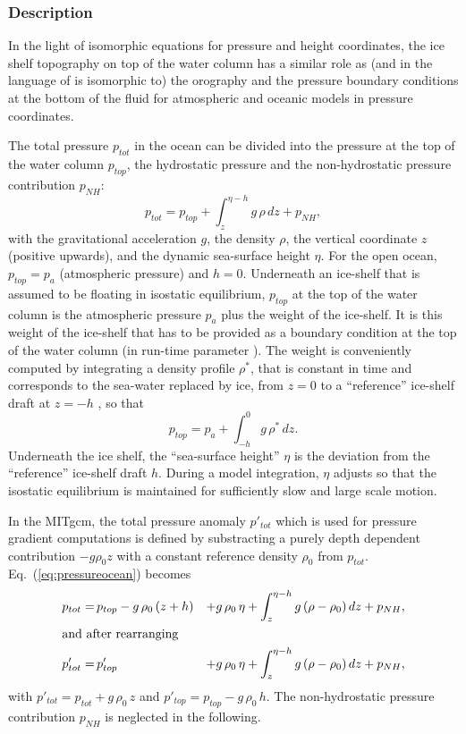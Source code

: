 \subsubsection{Description
\label{sec:pkg:shelfice:descr}}

In the light of isomorphic equations for pressure and height
coordinates, the ice shelf topography on top of the water column has a
similar role as (and in the language of \citet{marshall:04} is
isomorphic to) the orography and the pressure boundary conditions at
the bottom of the fluid for atmospheric and oceanic models in pressure
coordinates.
%

The total pressure $p_{tot}$ in the ocean can be divided into the
pressure at the top of the water column $p_{top}$, the hydrostatic
pressure and the non-hydrostatic pressure contribution $p_{NH}$:
\begin{equation}
  \label{eq:pressureocean}
  p_{tot} = p_{top} + \int_z^{\eta-h} g\,\rho\,dz + p_{NH}, 
\end{equation}
with the gravitational acceleration $g$, the density $\rho$, the
vertical coordinate $z$ (positive upwards), and the dynamic
sea-surface height $\eta$. For the open ocean, $p_{top}=p_{a}$
(atmospheric pressure) and $h=0$. Underneath an ice-shelf that is
assumed to be floating in isostatic equilibrium, $p_{top}$ at the top
of the water column is the atmospheric pressure $p_{a}$ plus the
weight of the ice-shelf. It is this weight of the ice-shelf that has
to be provided as a boundary condition at the top of the water column
(in run-time parameter ).
The weight is conveniently computed by integrating a density profile
$\rho^*$, that is constant in time and corresponds to the sea-water
replaced by ice, from $z=0$ to a ``reference'' ice-shelf draft at
$z=-h$ \citep{beckmann99}, so that
\begin{equation}
  \label{eq:ptop}
  p_{top} = p_{a} + \int_{-h}^{0}g\,\rho^{*}\,dz.
\end{equation}
Underneath the ice shelf, the ``sea-surface height'' $\eta$ is the
deviation from the ``reference'' ice-shelf draft $h$. During a model
integration, $\eta$ adjusts so that the isostatic equilibrium is
maintained for sufficiently slow and large scale motion.
  
In the MITgcm, the total pressure anomaly $p'_{tot}$ which is used for
pressure gradient computations is defined by substracting a purely
depth dependent contribution $-g\rho_{0}z$ with a constant reference
density $\rho_{0}$ from $p_{tot}$.  Eq.~(\ref{eq:pressureocean}) becomes
\begin{alignat}{2}
  \label{eq:pressure}
  p_{tot} =& \,p_{top} - g\,\rho_0\,(z+h)  &+ g\,\rho_0\,\eta + \int_z^{\eta-h}
  g\,(\rho-\rho_0)\,dz +   p_{NH}, \\
  \intertext{and after rearranging}
  p'_{tot} =& \,p'_{top}
  &+ g\,\rho_0\,\eta + \int_z^{\eta-h}g\,(\rho-\rho_0)\,dz +   p_{NH}, 
\end{alignat}
with $p'_{tot} = p_{tot} + g\,\rho_0\,z$ and $p'_{top} = p_{top} -
g\,\rho_0\,h$. The non-hydrostatic pressure contribution $p_{NH}$ is
neglected in the following.

